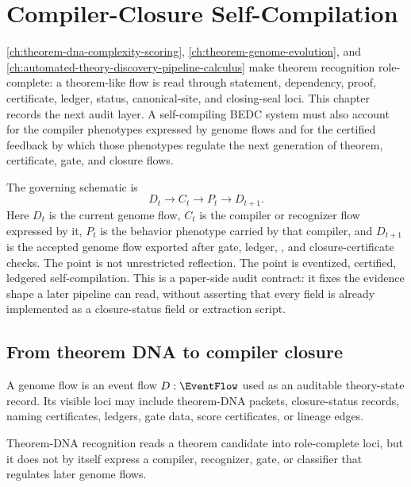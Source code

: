 \chapter{Compiler-Closure Self-Compilation}
\label{ch:compiler-closure-self-compilation}

\autoref{ch:theorem-dna-complexity-scoring},
\autoref{ch:theorem-genome-evolution}, and
\autoref{ch:automated-theory-discovery-pipeline-calculus} make theorem
recognition role-complete: a theorem-like flow is read through statement,
dependency, proof, certificate, ledger, status, canonical-site, and
closing-seal loci. This chapter records the next audit layer. A self-compiling
BEDC system must also account for the compiler phenotypes expressed by genome
flows and for the certified feedback by which those phenotypes regulate the
next generation of theorem, certificate, gate, and closure flows.

The governing schematic is
$$
D_t\longrightarrow C_t\longrightarrow P_t\longrightarrow D_{t+1}.
$$
Here $D_t$ is the current genome flow, $C_t$ is the compiler or recognizer
flow expressed by it, $P_t$ is the behavior phenotype carried by that compiler,
and $D_{t+1}$ is the accepted genome flow exported after gate, ledger,
\NameCert{}, and closure-certificate checks. The point is not unrestricted
reflection. The point is eventized, certified, ledgered self-compilation.
This is a paper-side audit contract: it fixes the evidence shape a later
pipeline can read, without asserting that every field is already implemented
as a closure-status field or extraction script.

\section{From theorem DNA to compiler closure}
\label{sec:compiler-closure-from-dna}

\begin{definition}
\label{def:compiler-closure-genome-flow}
A genome flow is an event flow $D:\EventFlow$ used as an auditable theory-state
record. Its visible loci may include theorem-DNA packets, closure-status
records, naming certificates, ledgers, gate data, score certificates, or
lineage edges.
\end{definition}

\begin{principle}
\label{prin:compiler-closure-one-directional-boundary}
Theorem-DNA recognition reads a theorem candidate into role-complete loci, but
it does not by itself express a compiler, recognizer, gate, or classifier that
regulates later genome flows.
\end{principle}

